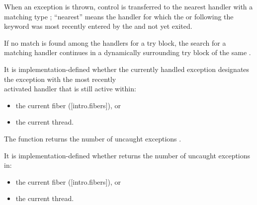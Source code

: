 
When an exception is thrown, control is transferred to the nearest handler
with a matching type ; ``nearest'' means the handler for
which the  or
 following the  keyword was
most recently entered by the  and
not yet exited.




If no match is found among the handlers for a try block, the search for a
matching handler continues in a dynamically surrounding try block of the same
.


\cbstart
It is implementation-defined whether the currently handled exception
designates the exception with the most recently\\
activated handler that is still active within:
\begin{itemize}
    \item the current fiber ([intro.fibers]), or
    \item the current thread.
\end{itemize}
\cbend


The function 
returns the number of uncaught exceptions .

\cbstart
It is implementation-defined whether  returns
the number of uncaught exceptions in:
\begin{itemize}
    \item the current fiber ([intro.fibers]), or
    \item the current thread.
\end{itemize}
\cbend

